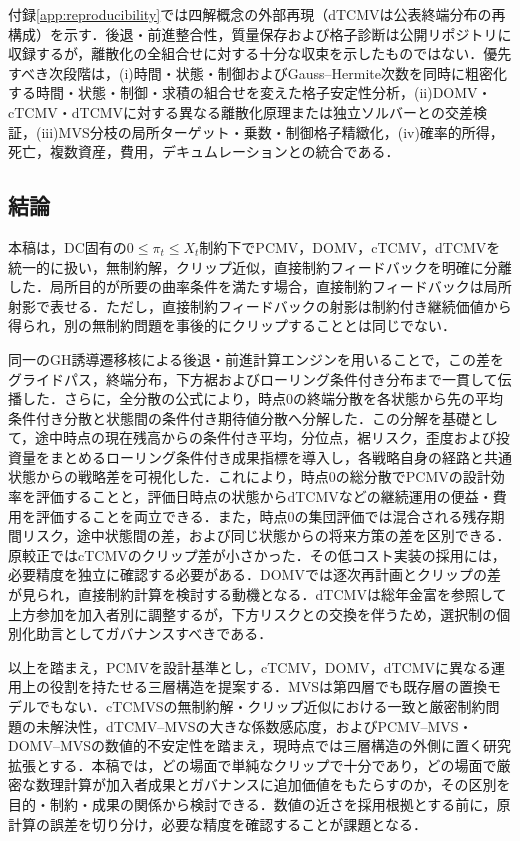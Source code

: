 \documentclass[10pt,a4paper]{article}
\theoremstyle{plain}
\theoremstyle{definition}
\begin{document}
付録\ref{app:reproducibility}では四解概念の外部再現（dTCMVは公表終端分布の再構成）を示す．後退・前進整合性，質量保存および格子診断は公開リポジトリに収録するが，離散化の全組合せに対する十分な収束を示したものではない．優先すべき次段階は，(i)時間・状態・制御およびGauss--Hermite次数を同時に粗密化する時間・状態・制御・求積の組合せを変えた格子安定性分析，(ii)DOMV・cTCMV・dTCMVに対する異なる離散化原理または独立ソルバーとの交差検証，(iii)MVS分枝の局所ターゲット・乗数・制御格子精緻化，(iv)確率的所得，死亡，複数資産，費用，デキュムレーションとの統合である．

\subsection{結論}
本稿は，DC固有の$0\leq\pi_t\leq X_t$制約下でPCMV，DOMV，cTCMV，dTCMVを統一的に扱い，無制約解，クリップ近似，直接制約フィードバックを明確に分離した．局所目的が所要の曲率条件を満たす場合，直接制約フィードバックは局所射影で表せる．ただし，直接制約フィードバックの射影は制約付き継続価値から得られ，別の無制約問題を事後的にクリップすることとは同じでない．

同一のGH誘導遷移核による後退・前進計算エンジンを用いることで，この差をグライドパス，終端分布，下方裾およびローリング条件付き分布まで一貫して伝播した．さらに，全分散の公式により，時点0の終端分散を各状態から先の平均条件付き分散と状態間の条件付き期待値分散へ分解した．この分解を基礎として，途中時点の現在残高からの条件付き平均，分位点，裾リスク，歪度および投資量をまとめるローリング条件付き成果指標を導入し，各戦略自身の経路と共通状態からの戦略差を可視化した．これにより，時点0の総分散でPCMVの設計効率を評価することと，評価日時点の状態からdTCMVなどの継続運用の便益・費用を評価することを両立できる．また，時点0の集団評価では混合される残存期間リスク，途中状態間の差，および同じ状態からの将来方策の差を区別できる．原較正ではcTCMVのクリップ差が小さかった．その低コスト実装の採用には，必要精度を独立に確認する必要がある．DOMVでは逐次再計画とクリップの差が見られ，直接制約計算を検討する動機となる．dTCMVは総年金富を参照して上方参加を加入者別に調整するが，下方リスクとの交換を伴うため，選択制の個別化助言としてガバナンスすべきである．

以上を踏まえ，PCMVを設計基準とし，cTCMV，DOMV，dTCMVに異なる運用上の役割を持たせる三層構造を提案する．MVSは第四層でも既存層の置換モデルでもない．cTCMVSの無制約解・クリップ近似における一致と厳密制約問題の未解決性，dTCMV--MVSの大きな係数感応度，およびPCMV--MVS・DOMV--MVSの数値的不安定性を踏まえ，現時点では三層構造の外側に置く研究拡張とする．本稿では，どの場面で単純なクリップで十分であり，どの場面で厳密な数理計算が加入者成果とガバナンスに追加価値をもたらすのか，その区別を目的・制約・成果の関係から検討できる．数値の近さを採用根拠とする前に，原計算の誤差を切り分け，必要な精度を確認することが課題となる．
\end{document}
